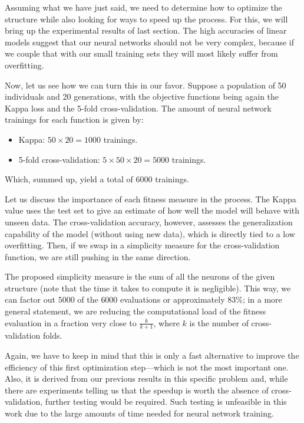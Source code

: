 	Assuming what we have just said, we need to determine how to optimize the structure while also looking for ways to speed up the process. For this, we will bring up the experimental results of last section. The high accuracies of linear models suggest that our neural networks should not be very complex, because if we couple that with our small training sets they will most likely suffer from overfitting.

\newpage

	Now, let us see how we can turn this in our favor. Suppose a population of 50 individuals and 20 generations, with the objective functions being again the Kappa loss and the 5-fold cross-validation. The amount of neural network trainings for each function is given by:

	\begin{itemize}

		\item
		Kappa: $50 \times 20 = 1000$ trainings.

		\item
		5-fold cross-validation: $5 \times 50 \times 20 = 5000$ trainings.

	\end{itemize}

	Which, summed up, yield a total of $6000$ trainings.

	Let us discuss the importance of each fitness measure in the process. The Kappa value uses the test set to give an estimate of how well the model will behave with unseen data. The cross-validation accuracy, however, assesses the generalization capability of the model (without using new data), which is directly tied to a low overfitting. Then, if we swap in a simplicity measure for the cross-validation function, we are still pushing in the same direction.

	The proposed simplicity measure is the sum of all the neurons of the given structure (note that the time it takes to compute it is negligible). This way, we can factor out $5000$ of the $6000$ evaluations or approximately $83\%$; in a more general statement, we are reducing the computational load of the fitness evaluation in a fraction very close to $\frac{k}{k+1}$, where $k$ is the number of cross-validation folds.

	Again, we have to keep in mind that this is only a fast alternative to improve the efficiency of this first optimization step---which is not the most important one. Also, it is derived from our previous results in this specific problem and, while there are experiments telling us that the speedup is worth the absence of cross-validation, further testing would be required. Such testing is unfeasible in this work due to the large amounts of time needed for neural network training.

